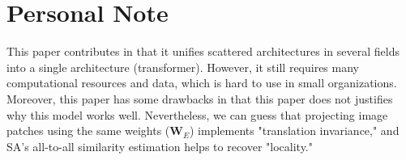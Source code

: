 \documentclass[10pt,twocolumn,letterpaper]{article}
\begin{document}
\section{Personal Note}
This paper contributes in that it unifies scattered architectures in several fields into a single architecture (transformer). However, it still requires many computational resources and data, which is hard to use in small organizations. Moreover, this paper has some drawbacks in that this paper does not justifies why this model works well. Nevertheless, we can guess that projecting image patches using the same weights ($\mathbf{W}_{E}$) implements "translation invariance," and SA's all-to-all similarity estimation helps to recover "locality."  


{\small


}
\end{document}
